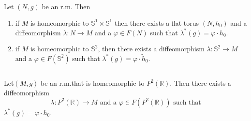 \subsection{}\label{chap8:8.11.3}

\begin{prop*}
Let $(N,g)$ be an r.m. Then
\begin{enumerate}
\renewcommand{\labelenumi}{\rm(\theenumi)}
\item if $M$ is homeomorphic to $\mathbb{S}^{1}\times \mathbb{S}^{1}$
  then there exists a flat torus $(N,h_{0})$ and a diffeomorphism
  $\lambda:N\to M$ and a $\varphi\in F(N)$ such that
  $\lambda^{\ast}(g)=\varphi\cdot h_{0}$.

\item if $M$ is homeomorphic to $\mathbb{S}^{2}$, then there exists a
  diffeomorphism $\lambda:\mathbb{S}^{2}\to M$ and a $\varphi\in
  F(\mathbb{S}^{2})$ such that $\lambda^{\ast}(g)=\varphi\cdot
  \widetilde{h}_{0}$.
\end{enumerate}
\end{prop*}


\subsection{}\label{chap8:8.11.4}

\begin{coro*}
Let\pageoriginale $(M,g)$ be an r.m.\@ that is homeomorphic to
$P^{2}(\mathbb{R})$. Then there exists a diffeomorphism
$$
\lambda:P^{2}(\mathbb{R})\to M\text{ \ and a \ }\varphi\in
F(P^{2}(\mathbb{R}))\text{ \ such that}
$$
$\lambda^{\ast}(g)=\varphi\cdot h_{0}$.
\end{coro*}


